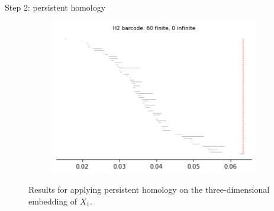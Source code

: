 \documentclass[xcolor={dvipsnames,svgnames}]{beamer}
\begin{document}
\begin{frame}{Step 2: persistent homology}
\begin{figure}[H]
\begin{subfigure}[b]{0.2\textwidth}
\includegraphics[width=\textwidth]{figures/X1_H2_barcode.png}
 \caption{}
\end{subfigure}
\caption{\scriptsize Results for applying persistent homology on the three-dimensional embedding of $X_1$.}
\end{figure}
\end{frame}
\end{document}
